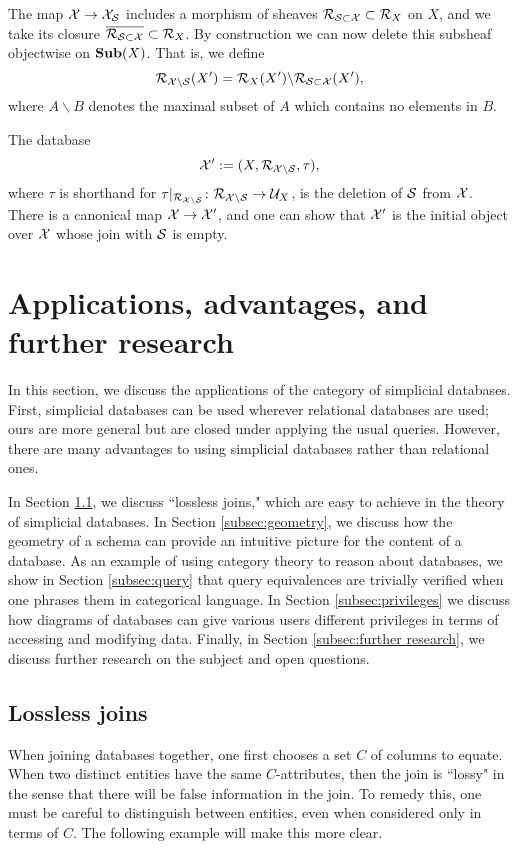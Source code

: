\documentclass{amsart}
\def\Sub{{\bf Sub}}
\begin{document}
The map $\mathcal{X}\rightarrow\mathcal{X}_\mathcal{S}$ includes a morphism of sheaves $\mathcal{R}_{\mathcal{S}\subset\mathcal{X}}\subset\mathcal{R}_X$ on $X$, and we take its closure $\overline{\mathcal{R}_{\mathcal{S}\subset\mathcal{X}}}\subset\mathcal{R}_X$.  By construction we can now delete this subsheaf objectwise on $\Sub(X)$.  That is, we define $$\mathcal{R}_{\mathcal{X}\backslash\mathcal{S}}(X')=\mathcal{R}_X(X')\backslash\mathcal{R}_{\mathcal{S}\subset\mathcal{X}}(X'),$$ where $A\backslash B$ denotes the maximal subset of $A$ which contains no elements in $B$.

The database $$\mathcal{X}':=(X,\mathcal{R}_{\mathcal{X}\backslash\mathcal{S}},\tau),$$ where $\tau$ is shorthand for $\tau|_{\mathcal{R}_{\mathcal{X}\backslash\mathcal{S}}}\colon\mathcal{R}_{\mathcal{X}\backslash\mathcal{S}}\rightarrow\mathcal{U}_X$, is the deletion of $\mathcal{S}$ from $\mathcal{X}$.  There is a canonical map $\mathcal{X}\rightarrow\mathcal{X}'$, and one can show that $\mathcal{X}'$ is the initial object over $\mathcal{X}$ whose join with $\mathcal{S}$ is empty.

\section{Applications, advantages, and further research}\label{sec:applications}

In this section, we discuss the applications of the category of simplicial databases.  First, simplicial databases can be used wherever relational databases are used; ours are more general but are closed under applying the usual queries.  However, there are many advantages to using simplicial databases rather than relational ones.  

In Section \ref{subsec:lossless}, we discuss ``lossless joins," which are easy to achieve in the theory of simplicial databases. In Section \ref{subsec:geometry}, we discuss how the geometry of a schema can provide an intuitive picture for the content of a database.  As an example of using category theory to reason about databases, we show in Section \ref{subsec:query} that query equivalences are trivially verified when one phrases them in categorical language.  In Section \ref{subsec:privileges} we discuss how diagrams of databases can give various users different privileges in terms of accessing and modifying data.  Finally, in Section \ref{subsec:further research}, we discuss further research on the subject and open questions.

\subsection{Lossless joins}\label{subsec:lossless}

When joining databases together, one first chooses a set $C$ of columns to equate.  When two distinct entities have the same $C$-attributes, then the join is ``lossy" in the sense that there will be false information in the join.  To remedy this, one must be careful to distinguish between entities, even when considered only in terms of $C$.  The following example will make this more clear.
\end{document}
